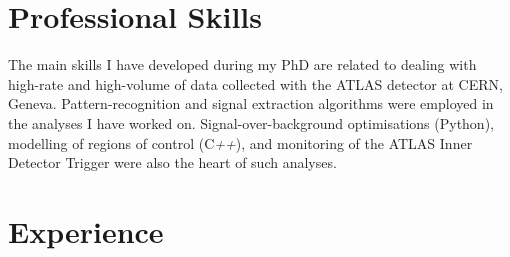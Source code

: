 \documentclass[]{cv} %
\begin{document}

\section{Professional Skills}
The main skills I have developed during my PhD are related to dealing with high-rate and high-volume of data collected with the ATLAS detector at CERN, Geneva. Pattern-recognition and signal extraction algorithms were employed in the analyses I have worked on. Signal-over-background optimisations (Python), modelling of regions of control (C\textit{++}), and monitoring of the ATLAS Inner Detector Trigger were also the heart of such analyses. 

\section{Experience}
\end{document}
